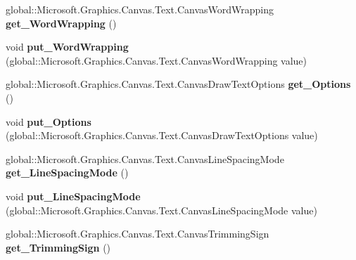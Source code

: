 \begin{DoxyCompactItemize}
global\+::\+Microsoft.\+Graphics.\+Canvas.\+Text.\+Canvas\+Word\+Wrapping {\bfseries get\+\_\+\+Word\+Wrapping} ()
\item 
\mbox{\label{interface_microsoft_1_1_graphics_1_1_canvas_1_1_text_1_1_i_canvas_text_layout_a9fd193e537a381cd8b74d7a6788b09b8}} 
void {\bfseries put\+\_\+\+Word\+Wrapping} (global\+::\+Microsoft.\+Graphics.\+Canvas.\+Text.\+Canvas\+Word\+Wrapping value)
\item 
\mbox{\label{interface_microsoft_1_1_graphics_1_1_canvas_1_1_text_1_1_i_canvas_text_layout_abcd9c95c3e186e366b308e9268aec7b3}} 
global\+::\+Microsoft.\+Graphics.\+Canvas.\+Text.\+Canvas\+Draw\+Text\+Options {\bfseries get\+\_\+\+Options} ()
\item 
\mbox{\label{interface_microsoft_1_1_graphics_1_1_canvas_1_1_text_1_1_i_canvas_text_layout_a2d49e25d90aae82a410bddfc947d5a20}} 
void {\bfseries put\+\_\+\+Options} (global\+::\+Microsoft.\+Graphics.\+Canvas.\+Text.\+Canvas\+Draw\+Text\+Options value)
\item 
\mbox{\label{interface_microsoft_1_1_graphics_1_1_canvas_1_1_text_1_1_i_canvas_text_layout_adf0a5326f22b270c50010a147728dbf0}} 
global\+::\+Microsoft.\+Graphics.\+Canvas.\+Text.\+Canvas\+Line\+Spacing\+Mode {\bfseries get\+\_\+\+Line\+Spacing\+Mode} ()
\item 
\mbox{\label{interface_microsoft_1_1_graphics_1_1_canvas_1_1_text_1_1_i_canvas_text_layout_a36fefc4917fac46be5776c84bed1b9de}} 
void {\bfseries put\+\_\+\+Line\+Spacing\+Mode} (global\+::\+Microsoft.\+Graphics.\+Canvas.\+Text.\+Canvas\+Line\+Spacing\+Mode value)
\item 
\mbox{\label{interface_microsoft_1_1_graphics_1_1_canvas_1_1_text_1_1_i_canvas_text_layout_aad4b6c408a3d13911d9e3f2963901bfe}} 
global\+::\+Microsoft.\+Graphics.\+Canvas.\+Text.\+Canvas\+Trimming\+Sign {\bfseries get\+\_\+\+Trimming\+Sign} ()

\end{DoxyCompactItemize}

